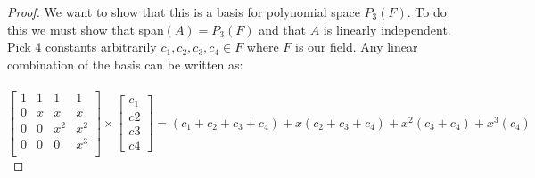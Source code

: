 \documentclass{article}
\begin{document}
\begin{proof}
	We want to show that this is a basis for polynomial space $P_3(F)$. To do this we must show that span$(A) = P_3(F)$ and that $A$ is linearly independent. Pick 4 constants arbitrarily $c_1, c_2, c_3, c_4 \in F$ where $F$ is our field. Any linear combination of the basis can be written as: \\\\
	$
	\begin{bmatrix}
	1 & 1 & 1 & 1 \\
	0 & x & x & x \\
	0 & 0 & x^2 & x^2 \\
	0 & 0 & 0 & x^3 \\
	\end{bmatrix} \times
	\begin{bmatrix}
	c_1 \\ c2 \\ c3 \\ c4
	\end{bmatrix}
	= (c_1 + c_2 + c_3 + c_4) + x(c_2 + c_3 + c_4) + x^2(c_3 + c_4) + x^3(c_4)$ \\
	

\end{proof}
\end{document}
